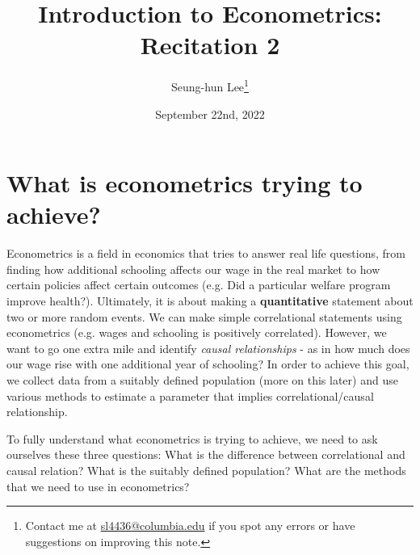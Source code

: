 \documentclass[12pt]{article}
\title{Introduction to Econometrics: Recitation 2}
\theoremstyle{definition}
\theoremstyle{property}
\theoremstyle{assumption}
\theoremstyle{example}
\theoremstyle{comment}
\begin{document}
\linespread{1.25}
\onehalfspacing

\author{Seung-hun Lee\footnote{Contact me at \href{mailto:sl4436@columbia.edu}{sl4436@columbia.edu} if you spot any errors or have suggestions on improving this note.}}
\date{September 22nd, 2022}
\maketitle
\thispagestyle{firstpage}


\section{What is econometrics trying to achieve?}
Econometrics is a field in economics that tries to answer real life questions, from finding how additional schooling affects our wage in the real market to how certain policies affect certain outcomes (e.g. Did a particular welfare program improve health?). Ultimately, it is about making a \textbf{quantitative} statement about two or more random events.  We can make simple correlational statements using econometrics (e.g. wages and schooling is positively correlated). However, we want to go one extra mile and identify \textit{causal relationships} - as in how much does our wage rise with one additional year of schooling? In order to achieve this goal, we collect data from a suitably defined population (more on this later) and use various methods to estimate a parameter that implies correlational/causal relationship. \par
To fully understand what econometrics is trying to achieve, we need to ask ourselves these three questions: What is the difference between correlational and causal relation? What is the suitably defined population? What are the methods that we need to use in econometrics?
\end{document}
